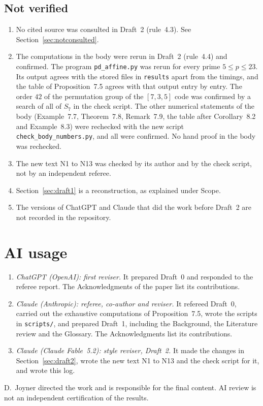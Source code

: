 \documentclass[12pt,letterpaper]{article}
\begin{document}
\subsection{Not verified}
\begin{enumerate}
\item No cited source was consulted in Draft~2 (rule~4.3). See
Section~\ref{sec:notconsulted}.
\item The computations in the body were rerun in Draft~2 (rule~4.4) and
confirmed. The program \texttt{pd\_affine.py} was rerun for every prime
$5\le p\le23$. Its output agrees with the stored files in \texttt{results}
apart from the timings, and the table of Proposition~7.5 agrees with that output
entry by entry. The order $42$ of the permutation group of the $[7,3,5]$ code was
confirmed by a search of all of $S_7$ in the check script. The other numerical
statements of the body (Example~7.7, Theorem~7.8, Remark~7.9, the table after
Corollary~8.2 and Example~8.3) were rechecked with the new script
\texttt{check\_body\_numbers.py}, and all were confirmed. No hand proof in
the body was rechecked.
\item The new text N1 to N13 was checked by its author and by the check script,
not by an independent referee.
\item Section~\ref{sec:draft1} is a reconstruction, as explained under Scope.
\item The versions of ChatGPT and Claude that did the work before Draft~2 are not
recorded in the repository.
\end{enumerate}

\section{AI usage}\label{sec:ai}
\begin{enumerate}
\item \emph{ChatGPT (OpenAI): first reviser.} It prepared Draft~0 and responded to
the referee report. The Acknowledgments of the paper list its contributions.
\item \emph{Claude (Anthropic): referee, co-author and reviser.} It refereed
Draft~0, carried out the exhaustive computations of Proposition~7.5, wrote the
scripts in \texttt{scripts/}, and prepared Draft~1, including the Background,
the Literature review and the Glossary. The Acknowledgments list its
contributions.
\item \emph{Claude (Claude Fable~5.2): style reviser, Draft~2.} It made the
changes in Section~\ref{sec:draft2}, wrote the new text N1 to N13 and the check script
for it, and wrote this log.
\end{enumerate}
D.~Joyner directed the work and is responsible for the final content. AI review is
not an independent certification of the results.
\end{document}
